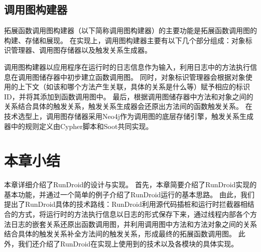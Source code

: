 \subsection{调用图构建器}

拓展函数调用图构建器（以下简称调用图构建器）的主要功能是拓展函数调用图的构建、存储和展现。
在实现上，调用图构建器主要有以下几个部分组成：对象标识管理器、调用图存储器以及触发关系生成器。

调用图构建器以应用程序在运行时的日志信息作为输入，利用日志中的方法执行信息在调用图储存器中初步建立函数调用图。
同时，对象标识管理器会根据对象使用的上下文（如该和哪个方法产生关联，具体的关系是什么等）赋予相应的标识ID，并将其添加到函数调用图中。
最后，根据调用图储存器中方法和对象之间的关系结合具体的触发关系，触发关系生成器会还原出方法间的函数触发关系。
在技术选型上，调用图存储器采用Neo4j作为调用图的底层存储引擎，触发关系生成器中的规则定义由Cypher脚本和Soot共同实现。



 \section{本章小结}

本章详细介绍了RunDroid的设计与实现。
首先，本章简要介绍了RunDroid实现的基本功能，并通过一个简单的例子介绍了RunDroid运行的基本思路。
由此，我们提出了RunDroid具体的技术路线：RunDroid利用源代码插桩和运行时拦截器相结合的方式，将运行时的方法执行信息以日志的形式保存下来，通过线程内部各个方法日志的嵌套关系还原出函数调用图，并利用调用图中方法和方法对象之间的关系结合具体的触发关系补全方法间的触发关系，形成最终的拓展函数调用图。
此外，我们还介绍了RunDroid在实现上使用到的技术以及各模块的具体实现。
